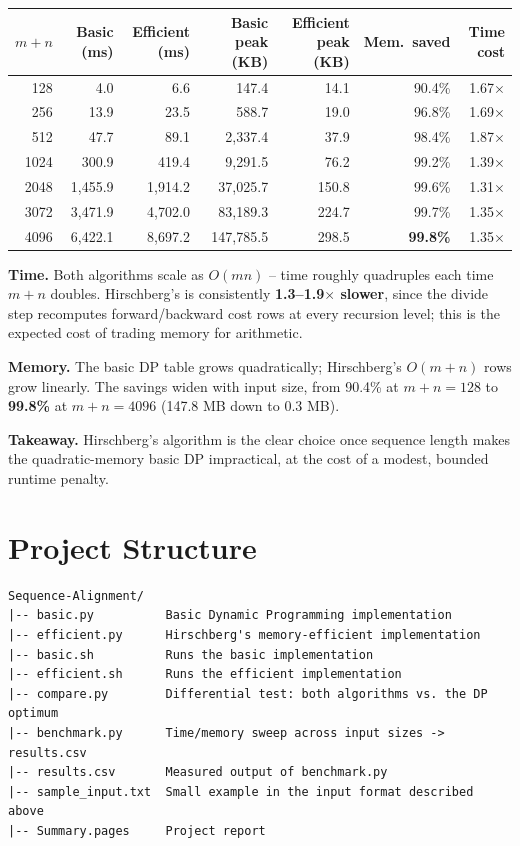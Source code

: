 \documentclass[11pt]{article}
\begin{document}
\begin{center}
\begin{tabular}{r r r r r r r}
\toprule
$m+n$ & Basic (ms) & Efficient (ms) & Basic peak (KB) & Efficient peak (KB) & Mem.\ saved & Time cost \\
\midrule
128  & 4.0    & 6.6    & 147.4    & 14.1  & 90.4\% & 1.67$\times$ \\
256  & 13.9   & 23.5   & 588.7    & 19.0  & 96.8\% & 1.69$\times$ \\
512  & 47.7   & 89.1   & 2{,}337.4 & 37.9  & 98.4\% & 1.87$\times$ \\
1024 & 300.9  & 419.4  & 9{,}291.5 & 76.2  & 99.2\% & 1.39$\times$ \\
2048 & 1{,}455.9 & 1{,}914.2 & 37{,}025.7 & 150.8 & 99.6\% & 1.31$\times$ \\
3072 & 3{,}471.9 & 4{,}702.0 & 83{,}189.3 & 224.7 & 99.7\% & 1.35$\times$ \\
4096 & 6{,}422.1 & 8{,}697.2 & 147{,}785.5 & 298.5 & \textbf{99.8\%} & 1.35$\times$ \\
\bottomrule
\end{tabular}
\end{center}

\textbf{Time.} Both algorithms scale as $O(mn)$ -- time roughly quadruples
each time $m+n$ doubles. Hirschberg's is consistently \textbf{1.3--1.9$\times$
slower}, since the divide step recomputes forward/backward cost rows at every
recursion level; this is the expected cost of trading memory for arithmetic.

\textbf{Memory.} The basic DP table grows quadratically; Hirschberg's $O(m+n)$
rows grow linearly. The savings widen with input size, from 90.4\% at
$m+n=128$ to \textbf{99.8\%} at $m+n=4096$ (147.8 MB down to 0.3 MB).

\textbf{Takeaway.} Hirschberg's algorithm is the clear choice once sequence
length makes the quadratic-memory basic DP impractical, at the cost of a
modest, bounded runtime penalty.

\section{Project Structure}

\begin{lstlisting}
Sequence-Alignment/
|-- basic.py          Basic Dynamic Programming implementation
|-- efficient.py      Hirschberg's memory-efficient implementation
|-- basic.sh          Runs the basic implementation
|-- efficient.sh      Runs the efficient implementation
|-- compare.py        Differential test: both algorithms vs. the DP optimum
|-- benchmark.py      Time/memory sweep across input sizes -> results.csv
|-- results.csv       Measured output of benchmark.py
|-- sample_input.txt  Small example in the input format described above
|-- Summary.pages     Project report
\end{lstlisting}
\end{document}
